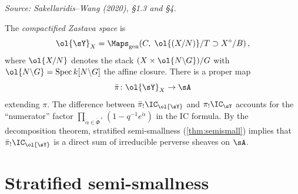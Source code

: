 \begin{definition}
  \label{def:compactified-zastava}
  \textit{Source: Sakellaridis--Wang (2020), §1.3 and §4.}

  The \emph{compactified Zastava space} is
  \[
    \ol{\sY}_X = \Maps_{\mathrm{gen}}\!\left(C,\;
       \ol{(X/N)}/T \supset X^\circ/B\right),
  \]
  where \( \ol{X/N} \) denotes the stack \( (X \times \ol{N \backslash G})/G \) with
  \( \ol{N \backslash G} = \mathrm{Spec}\, k[N \backslash G] \) the affine closure.
  There is a proper map
  \[
    \bar\pi \colon \ol{\sY}_X \to \sA
  \]
  extending \( \pi \).
  The difference between \( \bar\pi_! \IC_{\ol{\sY}} \) and \( \pi_! \IC_{\sY} \) accounts
  for the ``numerator'' factor
  \( \prod_{\check\alpha \in \check\Phi^+}(1 - q^{-1} e^{\check\alpha}) \)
  in the IC formula.
  By the decomposition theorem, stratified semi-smallness
  (\cref{thm:semismall}) implies that \( \bar\pi_! \IC_{\ol{\sY}} \) is a direct sum of
  irreducible perverse sheaves on \( \sA \).
\end{definition}


\section{Stratified semi-smallness}

